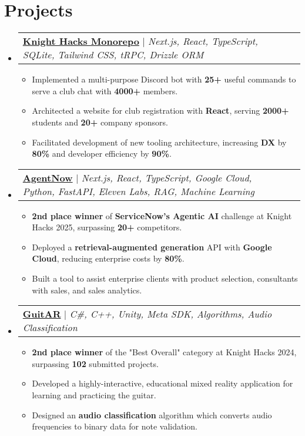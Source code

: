 \documentclass[letterpaper,11pt]{article}
\makeatletter
\newcommand{\resumeItem}[1]{
  \item\small{
    {#1 \vspace{-2pt}}
  }
}
\newcommand{\resumeProjectHeading}[2]{
    \item
    \begin{tabular*}{0.97\textwidth}{l@{\extracolsep{\fill}}r}
      \small#1\\
    \end{tabular*}\vspace{-7pt}
}
\newcommand{\resumeSubHeadingListStart}{\begin{itemize}[leftmargin=0.15in, label={}]}
\newcommand{\resumeSubHeadingListEnd}{\end{itemize}}
\newcommand{\resumeItemListStart}{\begin{itemize}}
\newcommand{\resumeItemListEnd}{\end{itemize}\vspace{-7pt}}
\makeatother
\begin{document}
\section{Projects}
    \resumeSubHeadingListStart
        \resumeProjectHeading
        {\textbf{\href{https://github.com/KnightHacks/forge}{Knight Hacks Monorepo}} $|$ \emph{Next.js, React, TypeScript, SQLite, Tailwind CSS, tRPC, Drizzle ORM}}{June 2021 -- Present}
        \resumeItemListStart
        \resumeItem{Implemented a multi-purpose Discord bot with \textbf{25+} useful commands to serve a club chat with \textbf{4000+} members.}
        \resumeItem{Architected a website for club registration with \textbf{React}, serving \textbf{2000+} students and \textbf{20+} company sponsors.}
        \resumeItem{Facilitated development of new tooling architecture, increasing \textbf{DX} by \textbf{80\%} and developer efficiency by \textbf{90\%}.}
        \resumeItemListEnd
      \resumeProjectHeading
        {\textbf{\href{https://devpost.com/software/agentnow}{AgentNow}} $|$ \emph{Next.js, React, TypeScript, Google Cloud, Python, FastAPI, Eleven Labs, RAG, Machine Learning}}{June 2021 -- Present}
          \resumeItemListStart
            \resumeItem{\textbf{2nd place winner} of \textbf{ServiceNow's Agentic AI} challenge at Knight Hacks 2025, surpassing \textbf{20+} competitors.}
            \resumeItem{Deployed a \textbf{retrieval-augmented generation} API with \textbf{Google Cloud}, reducing enterprise costs by \textbf{80\%}.}
            \resumeItem{Built a tool to assist enterprise clients with product selection, consultants with sales, and sales analytics.}
          \resumeItemListEnd
        \resumeProjectHeading
        {\textbf{\href{https://devpost.com/software/guitar-o3gw19}{GuitAR}} $|$ \emph{C\#, C++, Unity, Meta SDK, Algorithms, Audio Classification }}{June 2021 -- Present}
        \resumeItemListStart
          \resumeItem{\textbf{2nd place winner} of the "Best Overall" category at Knight Hacks 2024, surpassing \textbf{102} submitted projects.}
          \resumeItem{Developed a highly-interactive, educational mixed reality application for learning and practicing the guitar.}
          \resumeItem{Designed an \textbf{audio classification} algorithm which converts audio frequencies to binary data for note validation.}
        \resumeItemListEnd
    \resumeSubHeadingListEnd
%

\end{document}
